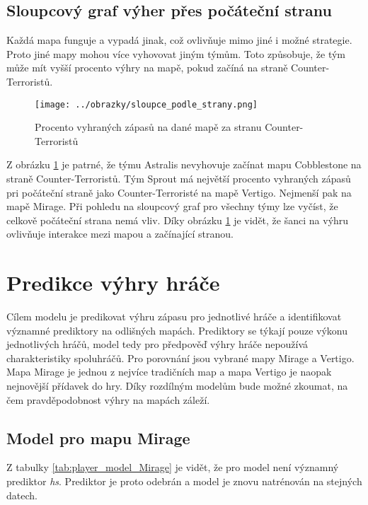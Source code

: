 \newpage
{\color{red}
\subsection{Sloupcový graf výher přes počáteční stranu}
Každá mapa funguje a vypadá jinak, což ovlivňuje mimo jiné i možné strategie. Proto jiné mapy mohou více vyhovovat jiným týmům. Toto způsobuje, že
tým může mít vyšší procento výhry na mapě, pokud začíná na straně Counter-Terroristů.

\begin{figure}[H]
    \centering
    \texttt{[image: ../obrazky/sloupce\_podle\_strany.png]}
    \caption{Procento vyhraných zápasů na dané mapě za stranu Counter-Terroristů} 
    \label{fig:sloupcovy_graf_strany}
\end{figure}

Z obrázku \ref{fig:sloupcovy_graf_strany} je patrné, že týmu Astralis nevyhovuje začínat mapu Cobblestone na straně Counter-Terroristů. Tým Sprout má největší procento
vyhraných zápasů pri počáteční straně jako Counter-Terroristé na mapě Vertigo. Nejmenší pak na mapě Mirage. Při pohledu na sloupcový graf pro všechny týmy lze vyčíst,
že celkově počáteční strana nemá vliv. Díky obrázku \ref{fig:sloupcovy_graf_strany} je vidět, že šanci na výhru ovlivňuje interakce mezi mapou a začínající stranou. 
}

\section{Predikce výhry hráče}
{\color{red}
Cílem modelu je predikovat výhru zápasu pro jednotlivé hráče a identifikovat významné prediktory na odlišných mapách.
}
Prediktory se týkají pouze výkonu jednotlivých hráčů, model tedy pro předpověď výhry hráče nepoužívá charakteristiky spoluhráčů. Pro porovnání jsou vybrané mapy Mirage a Vertigo.
Mapa Mirage je jednou z nejvíce tradičních map a mapa Vertigo je naopak nejnovější přídavek do hry. Díky rozdílným modelům bude možné zkoumat, na čem pravděpodobnost výhry na 
mapách záleží.

\subsection{Model pro mapu Mirage}



{\color{red}
Z tabulky \ref{tab:player_model_Mirage} je vidět, že pro model není významný prediktor \textit{hs}. Prediktor je proto odebrán a model je znovu natrénován na stejných datech.
}

